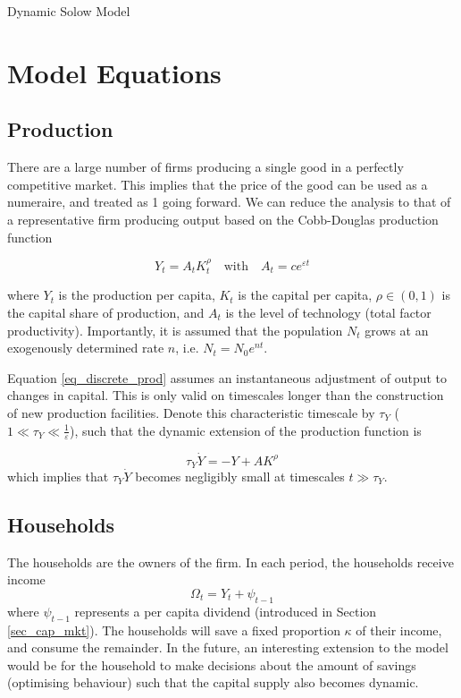 \documentclass[11pt]{article}
\begin{document}
\begin{center}
\huge
Dynamic Solow Model
\end{center}

\section{Model Equations}

\subsection{Production}\label{sec_prod}

There are a large number of firms producing a single good in a perfectly competitive market. This implies that the price of the good can be used as a numeraire, and treated as 1 going forward. We can reduce the analysis to that of a representative firm producing output based on the Cobb-Douglas production function

\begin{equation}\label{eq_discrete_prod}
Y_t = A_tK_t^{\rho} \quad \textrm{with}\quad A_t=ce^{\varepsilon t}
\end{equation}

where $Y_t$ is the production per capita, $K_t$ is the capital per capita, $\rho\in (0,1)$ is the capital share of production, and $A_t$ is the level of technology (total factor productivity). Importantly, it is assumed that the population $N_t$ grows at an exogenously determined rate $n$, i.e. $N_t = N_0e^{nt}$.

Equation \eqref{eq_discrete_prod} assumes an instantaneous adjustment of output to changes in capital. This is only valid on timescales longer than the construction of new production facilities. Denote this characteristic timescale by $\tau_Y$ ($1\ll\tau_Y\ll\frac{1}{\varepsilon}$), such that the dynamic extension of the production function is

\begin{equation}\label{eq_dyn_prod}
\tau_Y \dot{Y} = -Y + AK^{\rho}
\end{equation}
which implies that $\tau_Y\dot{Y}$ becomes negligibly small at timescales $t\gg\tau_Y$.

\subsection{Households}\label{sec_hh}
The households are the owners of the firm. In each period, the households receive income
\begin{equation}\label{eq_hh_income}
\Omega_t = Y_t + \psi_{t-1}
\end{equation}
where $\psi_{t-1}$ represents a per capita dividend (introduced in Section \ref{sec_cap_mkt}). The households will save a fixed proportion $\kappa$ of their income, and consume the remainder. In the future, an interesting extension to the model would be for the household to make decisions about the amount of savings (optimising behaviour) such that the capital supply also becomes dynamic.
\end{document}
